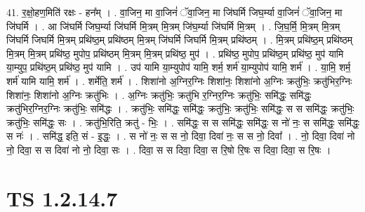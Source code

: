 \documentclass[17pt]{extarticle}
\begin{document}
41. र॒क्षो॒हण॒मिति॑ रक्षः - हन᳚म् । . वा॒जिन॒ मा वा॒जिनं॑ ॅवा॒जिन॒ मा जि॑घर्मि जिघ॒र्म्या वा॒जिनं॑ ॅवा॒जिन॒ मा जि॑घर्मि । . आ जि॑घर्मि जिघ॒र्म्या जि॑घर्मि मि॒त्रम् मि॒त्रम् जि॑घ॒र्म्या जि॑घर्मि मि॒त्रम् । . जि॒घ॒र्मि॒ मि॒त्रम् मि॒त्रम् जि॑घर्मि जिघर्मि मि॒त्रम् प्रथि॑ष्ठ॒म् प्रथि॑ष्ठम् मि॒त्रम् जि॑घर्मि जिघर्मि मि॒त्रम् प्रथि॑ष्ठम् । . मि॒त्रम् प्रथि॑ष्ठ॒म् प्रथि॑ष्ठम् मि॒त्रम् मि॒त्रम् प्रथि॑ष्ठ॒ मुपोप॒ प्रथि॑ष्ठम् मि॒त्रम् मि॒त्रम् प्रथि॑ष्ठ॒ मुप॑ । . प्रथि॑ष्ठ॒ मुपोप॒ प्रथि॑ष्ठ॒म् प्रथि॑ष्ठ॒ मुप॑ यामि या॒म्युप॒ प्रथि॑ष्ठ॒म् प्रथि॑ष्ठ॒ मुप॑ यामि । . उप॑ यामि या॒म्युपोप॑ यामि॒ शर्म॒ शर्म॑ या॒म्युपोप॑ यामि॒ शर्म॑ । . या॒मि॒ शर्म॒ शर्म॑ यामि यामि॒ शर्म॑ । . शर्मेति॒ शर्म॑ । . शिशा॑नो अ॒ग्निर॒ग्निः शिशा॑नः॒ शिशा॑नो अ॒ग्निः क्रतु॑भिः॒ क्रतु॑भिर॒ग्निः शिशा॑नः॒ शिशा॑नो अ॒ग्निः क्रतु॑भिः । . अ॒ग्निः क्रतु॑भिः॒ क्रतु॑भि र॒ग्निर॒ग्निः क्रतु॑भिः॒ समि॑द्धः॒ समि॑द्धः॒ क्रतु॑भिर॒ग्निर॒ग्निः क्रतु॑भिः॒ समि॑द्धः । . क्रतु॑भिः॒ समि॑द्धः॒ समि॑द्धः॒ क्रतु॑भिः॒ क्रतु॑भिः॒ समि॑द्धः॒ स स समि॑द्धः॒ क्रतु॑भिः॒ क्रतु॑भिः॒ समि॑द्धः॒ सः । . क्रतु॑भि॒रिति॒ क्रतु॑ - भिः॒ । . समि॑द्धः॒ स स समि॑द्धः॒ समि॑द्धः॒ स नो॑ नः॒ स समि॑द्धः॒ समि॑द्धः॒ स नः॑ । . समि॑द्ध॒ इति॒ सं - इ॒द्धः॒ । . स नो॑ नः॒ स स नो॒ दिवा॒ दिवा॑ नः॒ स स नो॒ दिवा᳚ । . नो॒ दिवा॒ दिवा॑ नो नो॒ दिवा॒ स स दिवा॑ नो नो॒ दिवा॒ सः । . दिवा॒ स स दिवा॒ दिवा॒ स रि॒षो रि॒षः स दिवा॒ दिवा॒ स रि॒षः । \newline
\pagebreak
{}
\section*{ TS 1.2.14.7 }
\end{document}
